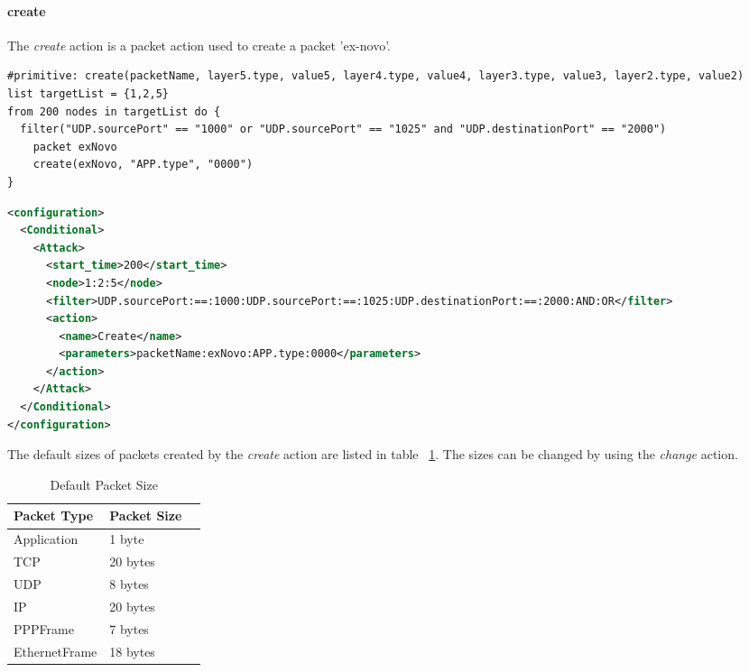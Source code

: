 \paragraph{create}
The \emph{create} action is a packet action used to create a packet 'ex-novo'.
%
\begin{lstlisting}[language={asl},caption={ASL create example}]
#primitive: create(packetName, layer5.type, value5, layer4.type, value4, layer3.type, value3, layer2.type, value2)
list targetList = {1,2,5}
from 200 nodes in targetList do {
  filter("UDP.sourcePort" == "1000" or "UDP.sourcePort" == "1025" and "UDP.destinationPort" == "2000")
    packet exNovo
    create(exNovo, "APP.type", "0000")
}
\end{lstlisting}
%
\begin{lstlisting}[language={xml},caption={Interpreter output}]
<configuration>
  <Conditional>
    <Attack>
      <start_time>200</start_time>
      <node>1:2:5</node>
      <filter>UDP.sourcePort:==:1000:UDP.sourcePort:==:1025:UDP.destinationPort:==:2000:AND:OR</filter>
      <action>
        <name>Create</name>
        <parameters>packetName:exNovo:APP.type:0000</parameters>
      </action>
    </Attack>
  </Conditional>
</configuration>
\end{lstlisting}

The default sizes of packets created by the \emph{create} action are listed in table ~\ref{tab:packetSize-table}. The sizes can be changed by using the \emph{change} action.

%
\begin{table}[ppp]
\centering
\begin{tabular}{lll}
\toprule
\textbf{Packet Type}&\textbf{Packet Size}&\\
\midrule
Application		& 1 byte	\\
TCP				& 20 bytes \\
UDP 				& 8 bytes \\
IP				& 20 bytes \\
PPPFrame 		& 7 bytes \\
EthernetFrame 	& 18 bytes \\
\bottomrule
\end{tabular}
\caption{Default Packet Size}
\label{tab:packetSize-table}
\end{table}

